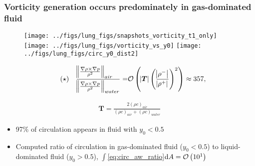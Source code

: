 
\begin{frame} \frametitle{\vspace*{0.5cm}Vorticity generation occurs predominately in gas-dominated fluid}
  \vspace*{-.5cm}
  {\scriptsize
    \begin{figure}
      \centering
      \hfill
      \texttt{[image: ../figs/lung\_figs/snapshots\_vorticity\_t1\_only]} \hfill
      \texttt{[image: ../figs/lung\_figs/vorticity\_vs\_y0]} \hfill
      \texttt{[image: ../figs/lung\_figs/circ\_y0\_dist2]}
      \hfill
    \end{figure}
    \vspace*{-.3cm}
    \begin{minipage}{0.6\textwidth}
      \begin{align*}%
        \label{eq:circ_aw_ratio}
      \tag{$\star$} \quad
      \frac{\norm{\frac{\nabla\rho\times\nabla p}{\rho^2}}_{air\quad}}{\norm{\frac{\nabla\rho\times\nabla p}{\rho^2}}_{water}}%
      =&\orderof{\abs{\boldsymbol{T}}\left(\frac{\abs{\rho^-}}{\abs{\rho^+}}\right)^2}%
         \approx 357,
    \end{align*}
    \end{minipage}\hfill
    \begin{minipage}{0.35\textwidth}
      \begin{align*}
        \boldsymbol{T}=\frac{2\left(\rho c\right)_{air}}{\left(\rho c\right)_{air}+\left(\rho c\right)_{water}}
      \end{align*}
    \end{minipage}
    \vspace*{0.15cm}
    \begin{itemize}
    \item 97\% of circulation appears in fluid with $y_0<0.5$
    \item Computed ratio of circulation in gas-dominated fluid  ($y_0<0.5$) to liquid-dominated fluid ($y_0>0.5$),  $\int$\eqref{eq:circ_aw_ratio}$\mathop{}\!\mathrm{d} A = \mathcal{O}\left(10^1\right)$
    \end{itemize}
  }
\end{frame}
